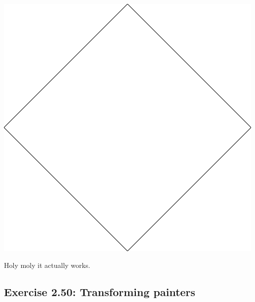 \documentclass[final,fleqn,titlepage,twoside]{article}
\begin{document}
\begin{center}
\includegraphics[width=.9\linewidth]{2/pict/testline.png}
\end{center}

Holy moly it actually works.

\subsection{Exercise 2.50: Transforming painters}
\label{sec:orgceb6fd8}
\end{document}
